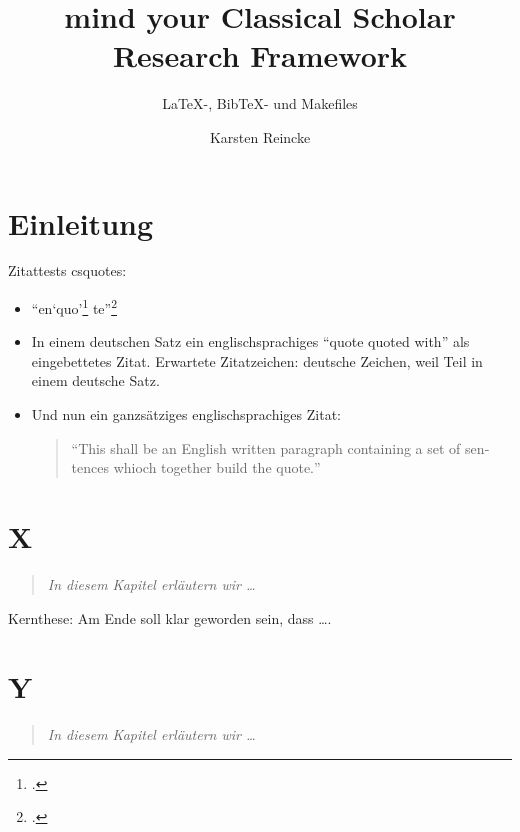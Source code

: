 \documentclass[DIV=calc,BCOR=5mm,11pt,headings=small,oneside,abstract=true,toc=bib]{scrbook}
\begin{document}
\nocite{*}

\titlehead{Geisteswissenschftliche Forschungsarbeit}
\subject{myCsrf-}
\title{mind your Classical Scholar Research Framework}
\subtitle{LaTeX-, BibTeX- und Makefiles}
\author{Karsten Reincke}
\maketitle

\footnotesize
\tableofcontents

\normalsize
\chapter{Einleitung}
Zitattests csquotes: 

\begin{itemize}
  \item \enquote{en\enquote{quo}\footcite[vgl.][15]{AllHen2008a}
te}\footcite[vgl.][15]{AllHen2008a}

  \item In einem deutschen Satz ein englischsprachiges
  \foreignquote{english}{quote quoted with} als eingebettetes Zitat. Erwartete
  Zitatzeichen: deutsche Zeichen, weil Teil in einem deutsche Satz.
  
  \item Und nun ein ganzsätziges englischsprachiges Zitat:
  \begin{quote}
    \foreignquote{english}{This shall be an English written paragraph containing
    a set of sentences whioch together build the quote.}
  \end{quote}
  
\end{itemize}

\chapter{X}
\begin{quote}\itshape
In diesem Kapitel erläutern wir \ldots
\end{quote} 

Kernthese: Am Ende soll klar geworden sein, dass \ldots.

\chapter{Y}
\begin{quote}\itshape
In diesem Kapitel erläutern wir \ldots
\end{quote} 
\end{document}
